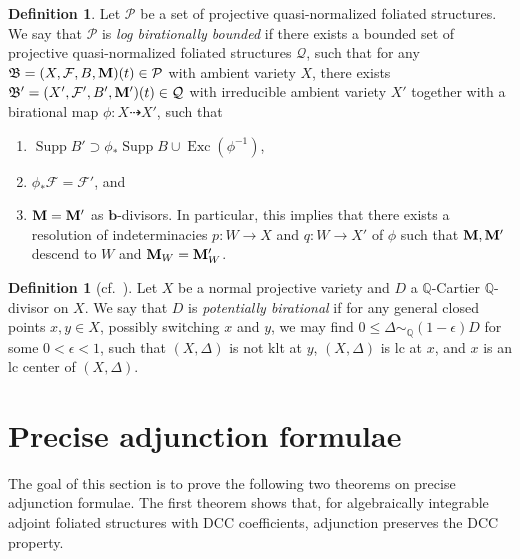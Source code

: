 \documentclass[11pt,reqno]{amsart}
\numberwithin{equation}{section}
\newcommand{\bb}{\bm{b}}
\newcommand{\Mm}{{\bf{M}}}
\newcommand{\Exc}{\operatorname{Exc}}
\newcommand{\Supp}{\operatorname{Supp}}
\newcommand{\Bb}{{\mathfrak{B}}}
\newcommand{\Ff}{\mathcal{F}}
\theoremstyle{definition}
\newtheorem{defn}[thm]{Definition}
\begin{document}
\begin{defn}\label{defn: lbb}
Let $\mathcal{P}$ be a set of projective quasi-normalized foliated structures. We say that $\mathcal{P}$ is \emph{log birationally bounded} if there exists a bounded set of projective quasi-normalized foliated structures $\mathcal{Q}$, such that for any $\Bb=(X,\Ff,B,\Mm)(t)\in\mathcal{P}$ with ambient variety $X$, there exists $\Bb'=(X',\Ff',B',\Mm')(t)\in\mathcal{Q}$ with irreducible ambient variety $X'$ together with a birational map $\phi\colon X\dashrightarrow X'$, such that 
\begin{enumerate}
    \item $\Supp B'\supset\phi_*\Supp B\cup\Exc(\phi^{-1})$,   
    \item $\phi_*\Ff=\Ff'$, and
    \item $\Mm=\Mm'$ as $\bb$-divisors. In particular, this implies that there exists a resolution of indeterminacies $p\colon W\rightarrow X$ and $q\colon W\rightarrow X'$ of $\phi$ such that $\Mm,\Mm'$ descend to $W$ and $\Mm_W=\Mm'_W$.
\end{enumerate}
\end{defn}




\begin{defn}[{cf.~\cite[Definition~3.5.3]{HMX14}}]
    Let $X$ be a normal projective variety and $D$ a $\mathbb Q$-Cartier $\mathbb Q$-divisor on $X$. We say that $D$ is \emph{potentially birational} if for any general closed points $x,y\in X$, possibly switching $x$ and $y$, we may find $0\leq\Delta\sim_{\mathbb Q}(1-\epsilon)D$ for some $0<\epsilon<1$, such that $(X,\Delta)$ is not klt at $y$, $(X,\Delta)$ is lc at $x$, and $x$ is an lc center of $(X,\Delta)$.
\end{defn}






\section{Precise adjunction formulae}\label{sec: precise adj}

The goal of this section is to prove the following two theorems on precise adjunction formulae. The first theorem shows that, for algebraically integrable adjoint foliated structures with DCC coefficients, adjunction preserves the DCC property.
\end{document}
